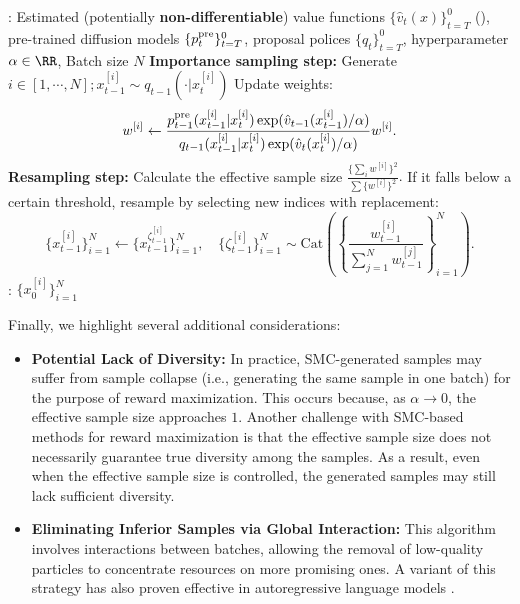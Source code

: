 \begin{algorithm}[!th]
\caption{SMC-Based Guidance (e.g.,  \citet{wu2024practical,dou2024diffusion,cardoso2023monte,phillips2024particle})}\label{alg:SMC}
\begin{algorithmic}[1]
     : Estimated (potentially \textbf{non-differentiable}) value functions $\{\hat v_t(x)\}_{t=T}^0$ (), pre-trained diffusion models $\{p^{\mathrm{pre}}_t\}_{t=T}^0$, proposal polices $\{q_t\}_{t=T}^0$, hyperparameter $\alpha \in \RR$, Batch size $N$
       \STATE \textbf{Importance sampling step:}  \label{line:IS} 
Generate $i \in [1,\cdots, N]; x^{[i]}_{t-1} \sim q_{t-1}(\cdot| x^{[i]}_{t})$
       \STATE Update weights:
       \begin{align*}
          w^{[i]} \leftarrow  \frac{ p^{\mathrm{pre}}_{t-1}(x^{[i]}_{t-1}|x^{[i]}_{t} )\exp(\hat v_{t-1}(x^{[i]}_{t-1})/\alpha) }{q_{t-1}(x^{[i]}_{t-1}|x^{[i]}_{t} )\exp(\hat v_t(x^{[i]}_{t})/\alpha)  }w^{[i]}.  
       \end{align*} 
        \STATE \textbf{Resampling step:} Calculate the effective sample size $
            \frac{\{\sum_i w^{[i]} \} ^2  }{\sum \{ w^{[i]}\}^2}.$
        If it falls below a certain threshold, resample by selecting new indices with replacement:  \\ 
       $$\{x^{[i]}_{t-1}\}_{i=1}^N  \leftarrow \{x^{\zeta^{[i]}_{t-1}}_{t-1}\}_{i=1}^N,\quad \{\zeta^{[i]}_{t-1}\}_{i=1}^N \sim \mathrm{Cat}\left ( \left \{\frac{w^{[i]}_{t-1}}{\sum_{j=1}^N w^{[j]}_{t-1} } \right \}_{i=1}^N\right).$$\label{line:selection}
     \ENDFOR
  : $\{ x^{[i]}_0\}_{i=1}^N$
\end{algorithmic}
\end{algorithm} 


Finally, we highlight several additional considerations:
\begin{itemize} 
\item \textbf{Potential Lack of Diversity:} In practice, SMC-generated samples may suffer from sample collapse (i.e., generating the same sample in one batch) for the purpose of reward maximization. This occurs because, as $\alpha \to 0$, the effective sample size approaches $1$. Another challenge with SMC-based methods for reward maximization is that the effective sample size does not necessarily guarantee true diversity among the samples. As a result, even when the effective sample size is controlled, the generated samples may still lack sufficient diversity.
\item \textbf{Eliminating Inferior Samples via Global Interaction:} This algorithm involves interactions between batches, allowing the removal of low-quality particles to concentrate resources on more promising ones. A variant of this strategy has also proven effective in autoregressive language models \citep{zhang2024accelerating}. 
\end{itemize}




